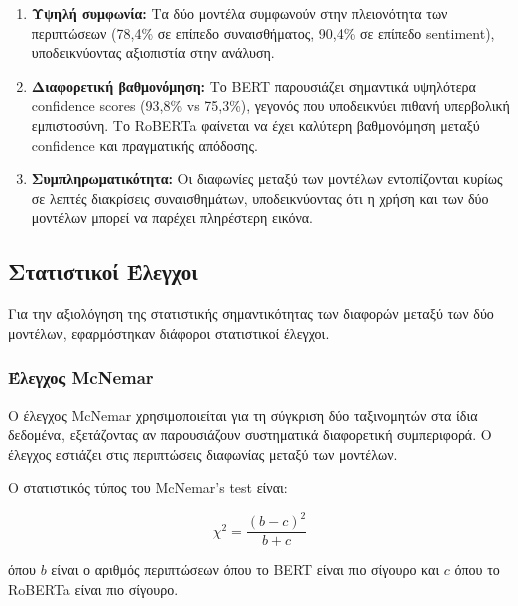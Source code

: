 \documentclass[a4paper,11pt,oneside,openany]{ioniothesis}
\begin{document}
\begin{enumerate}
    \item \textbf{Υψηλή συμφωνία:} Τα δύο μοντέλα συμφωνούν στην πλειονότητα των περιπτώσεων (78,4\% σε επίπεδο συναισθήματος, 90,4\% σε επίπεδο sentiment), υποδεικνύοντας αξιοπιστία στην ανάλυση.
    
    \item \textbf{Διαφορετική βαθμονόμηση:} Το BERT παρουσιάζει σημαντικά υψηλότερα confidence scores (93,8\% vs 75,3\%), γεγονός που υποδεικνύει πιθανή υπερβολική εμπιστοσύνη. Το RoBERTa φαίνεται να έχει καλύτερη βαθμονόμηση μεταξύ confidence και πραγματικής απόδοσης.
    
    \item \textbf{Συμπληρωματικότητα:} Οι διαφωνίες μεταξύ των μοντέλων εντοπίζονται κυρίως σε λεπτές διακρίσεις συναισθημάτων, υποδεικνύοντας ότι η χρήση και των δύο μοντέλων μπορεί να παρέχει πληρέστερη εικόνα.
\end{enumerate}
\newpage










\subsection{Στατιστικοί Έλεγχοι}
\label{sec:Στατιστικοί Έλεγχοι}

Για την αξιολόγηση της στατιστικής σημαντικότητας των διαφορών μεταξύ των δύο μοντέλων, εφαρμόστηκαν διάφοροι στατιστικοί έλεγχοι.

\subsubsection{Έλεγχος McNemar}
\label{sec:Έλεγχος McNemar}

Ο έλεγχος McNemar χρησιμοποιείται για τη σύγκριση δύο ταξινομητών στα ίδια δεδομένα, εξετάζοντας αν παρουσιάζουν συστηματικά διαφορετική συμπεριφορά. Ο έλεγχος εστιάζει στις περιπτώσεις διαφωνίας μεταξύ των μοντέλων.

Ο στατιστικός τύπος του McNemar's test είναι:

\begin{equation}
\chi^2 = \frac{(b - c)^2}{b + c}
\label{eq:mcnemar}
\end{equation}

όπου $b$ είναι ο αριθμός περιπτώσεων όπου το BERT είναι πιο σίγουρο και $c$ όπου το RoBERTa είναι πιο σίγουρο.
\end{document}
